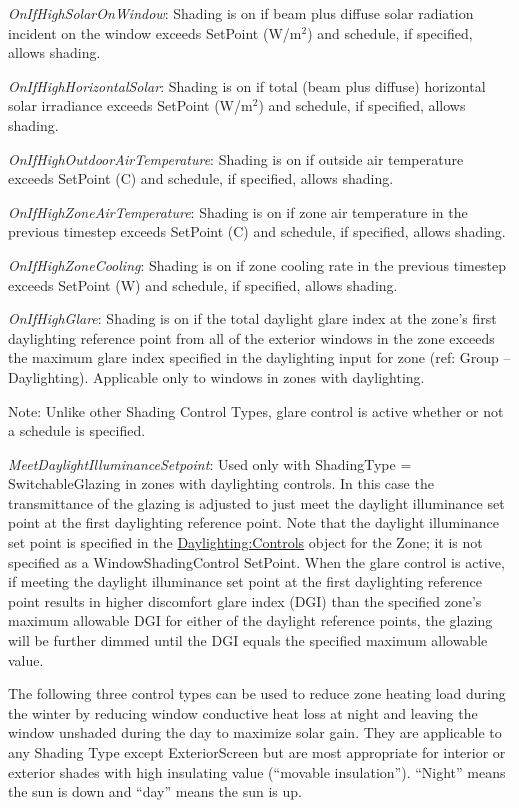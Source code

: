 \emph{OnIfHighSolarOnWindow}: Shading is on if beam plus diffuse solar radiation incident on the window exceeds SetPoint (W/m\(^{2}\)) and schedule, if specified, allows shading.

\emph{OnIfHighHorizontalSolar}: Shading is on if total (beam plus diffuse) horizontal solar irradiance exceeds SetPoint (W/m\(^{2}\)) and schedule, if specified, allows shading.

\emph{OnIfHighOutdoorAirTemperature}: Shading is on if outside air temperature exceeds SetPoint (C) and schedule, if specified, allows shading.

\emph{OnIfHighZoneAirTemperature}: Shading is on if zone air temperature in the previous timestep exceeds SetPoint (C) and schedule, if specified, allows shading.

\emph{OnIfHighZoneCooling}: Shading is on if zone cooling rate in the previous timestep exceeds SetPoint (W) and schedule, if specified, allows shading.

\emph{OnIfHighGlare}: Shading is on if the total daylight glare index at the zone's first daylighting reference point from all of the exterior windows in the zone exceeds the maximum glare index specified in the daylighting input for zone (ref: Group -- Daylighting). Applicable only to windows in zones with daylighting.

Note: Unlike other Shading Control Types, glare control is active whether or not a schedule is specified.

\emph{MeetDaylightIlluminanceSetpoint}: Used only with ShadingType = SwitchableGlazing in zones with daylighting controls. In this case the transmittance of the glazing is adjusted to just meet the daylight illuminance set point at the first daylighting reference point. Note that the daylight illuminance set point is specified in the \hyperref[daylightingcontrols-000]{Daylighting:Controls} object for the Zone; it is not specified as a WindowShadingControl SetPoint. When the glare control is active, if meeting the daylight illuminance set point at the first daylighting reference point results in higher discomfort glare index (DGI) than the specified zone's maximum allowable DGI for either of the daylight reference points, the glazing will be further dimmed until the DGI equals the specified maximum allowable value.

The following three control types can be used to reduce zone heating load during the winter by reducing window conductive heat loss at night and leaving the window unshaded during the day to maximize solar gain. They are applicable to any Shading Type except ExteriorScreen but are most appropriate for interior or exterior shades with high insulating value (``movable insulation''). ``Night'' means the sun is down and ``day'' means the sun is up.

